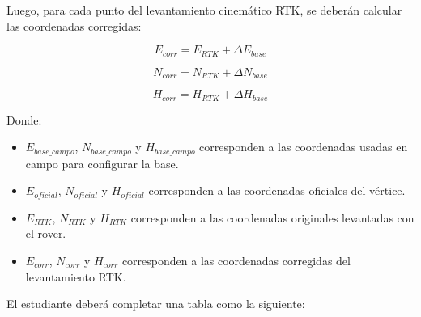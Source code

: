 \documentclass[
  letterpaper,
  DIV=11,
  numbers=noendperiod]{scrartcl}
\providecommand{\tightlist}{%
  \setlength{\itemsep}{0pt}\setlength{\parskip}{0pt}}\usepackage{longtable,booktabs,array}
\begin{document}
Luego, para cada punto del levantamiento cinemático RTK, se deberán
calcular las coordenadas corregidas:

\[
E_{corr} = E_{RTK} + \Delta E_{base}
\]

\[
N_{corr} = N_{RTK} + \Delta N_{base}
\]

\[
H_{corr} = H_{RTK} + \Delta H_{base}
\]

Donde:

\begin{itemize}
\tightlist
\item
  \(E_{base\_campo}\), \(N_{base\_campo}\) y \(H_{base\_campo}\)
  corresponden a las coordenadas usadas en campo para configurar la
  base.
\item
  \(E_{oficial}\), \(N_{oficial}\) y \(H_{oficial}\) corresponden a las
  coordenadas oficiales del vértice.
\item
  \(E_{RTK}\), \(N_{RTK}\) y \(H_{RTK}\) corresponden a las coordenadas
  originales levantadas con el rover.
\item
  \(E_{corr}\), \(N_{corr}\) y \(H_{corr}\) corresponden a las
  coordenadas corregidas del levantamiento RTK.
\end{itemize}

El estudiante deberá completar una tabla como la siguiente:
\end{document}
